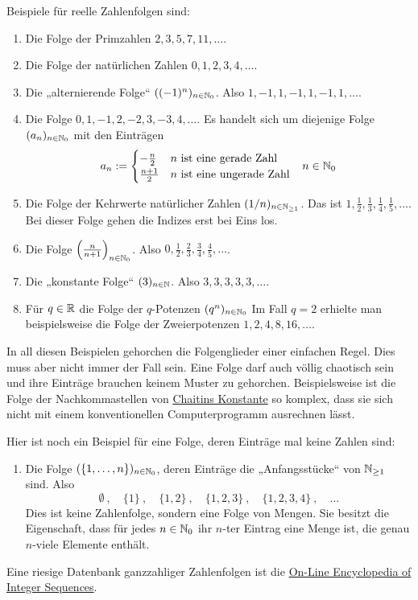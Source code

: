 \begin{bsp}
    Beispiele für reelle Zahlenfolgen sind:
    \begin{enumerate}
        \item Die Folge der Primzahlen $2,3,5,7,11,\dots$.
        \item Die Folge der natürlichen Zahlen $0,1,2,3,4,\dots$.
        \item Die „alternierende Folge“ $((-1)^n)_{n\in \mathbb N_0}$. Also $1,-1,1,-1,1,-1,1,\dots$.
        \item Die Folge $0,1,-1,2,-2,3,-3,4,\dots$. Es handelt sich um diejenige Folge $(a_n)_{n\in \mathbb N_0}$ mit den Einträgen
        \begin{align*}
            a_n := \begin{cases}
                -\frac{n}{2} & n\ \text{ist eine gerade Zahl} \\
                \frac{n+1}{2} & n\ \text{ist eine ungerade Zahl}
            \end{cases} && n \in \mathbb N_0
        \end{align*}
        \item Die Folge der Kehrwerte natürlicher Zahlen $(1/n)_{n\in \mathbb N_{\ge 1}}$. Das ist  $1,\frac{1}{2},\frac{1}{3},\frac{1}{4},\frac{1}{5},\dots$. Bei dieser Folge gehen die Indizes erst bei Eins los.
        \item Die Folge $\left(\frac{n}{n+1}\right)_{n\in \mathbb N_0}$. Also $0,\frac{1}{2},\frac{2}{3},\frac{3}{4},\frac{4}{5},\dots$.
        \item Die „konstante Folge“ $(3)_{n\in \mathbb N}$. Also $3,3,3,3,3,\dots$.
        \item Für $q\in \mathbb R$ die Folge der $q$-Potenzen $(q^n)_{n\in \mathbb N_0}$ Im Fall $q=2$ erhielte man beispielsweise die Folge der Zweierpotenzen $1,2,4,8,16,\dots$.
    \end{enumerate}
    In all diesen Beispielen gehorchen die Folgenglieder einer einfachen Regel. Dies muss aber nicht immer der Fall sein. Eine Folge darf auch völlig chaotisch sein und ihre Einträge brauchen keinem Muster zu gehorchen. Beispielsweise ist die Folge der Nachkommastellen von \href{https://de.wikipedia.org/wiki/Chaitinsche_Konstante}{Chaitins Konstante} so komplex, dass sie sich nicht mit einem konventionellen Computerprogramm ausrechnen lässt.
        
    Hier ist noch ein Beispiel für eine Folge, deren Einträge mal keine Zahlen sind:
    \begin{enumerate}[(9)]
        \item Die Folge $(\{1,\dots , n\})_{n\in \mathbb N_0}$, deren Einträge die „Anfangsstücke“ von $\mathbb N_{\ge 1}$ sind. Also
            \[ \emptyset\ ,\quad \{1\}\ ,\quad \{1,2\}\ ,\quad \{1,2,3\}\ ,\quad \{1,2,3,4\}\ , \quad \dots \]
        Dies ist keine Zahlenfolge, sondern eine Folge von Mengen. Sie besitzt die Eigenschaft, dass für jedes $n\in \mathbb N_0$ ihr $n$-ter Eintrag eine Menge ist, die genau $n$-viele Elemente enthält.
    \end{enumerate}
    Eine riesige Datenbank ganzzahliger Zahlenfolgen ist die \href{https://oeis.org/}{On-Line Encyclopedia of Integer Sequences}.
\end{bsp}


